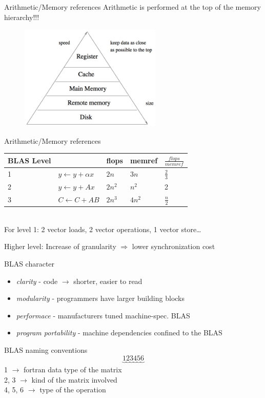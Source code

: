 	\begin{frame}{Arithmetic/Memory references}
		Arithmetic is performed at the top of the memory hierarchy!!!
		\begin{figure}
			\includegraphics[height=5cm]{img/13/arithmeticmemref}
		\end{figure}
	\end{frame}
	\begin{frame}{Arithmetic/Memory references}
		\begin{tabular}{ | l | l | l | l | l |}
		\hline
		BLAS Level & 		& flops 	&memref 	& $\frac{flops}{mem ref}$ \\ \hline
		1 & $y \leftarrow y + \alpha x$ 	& $2n$ 	& $3n$ 	& $\frac{2}{3} $ \\ \hline
		2 & $y \leftarrow y + Ax$ 		& $2n^2$ 	& $n^2$ 	& 2 			\\ \hline
		3 & $C \leftarrow C + AB$ 	& $2n^3$ 	& $4n^2$ 	& $\frac{n}{2}$ 	\\ \hline
		\end{tabular} \\ 
		
		For level 1: 2 vector loads, 2 vector operations, 1 vector store\dots 
		
		Higher level: Increase of granularity $\Rightarrow$ lower synchronization cost
	\end{frame}
	\begin{frame}{BLAS character}
		\begin{itemize}
			\item \textit{clarity} - code $\rightarrow$ shorter, easier to read
			\item \textit{modularity} - programmers have larger building blocks
			\item \textit{performace} - manufacturers tuned machine-spec. BLAS
			\item \textit{program portability} - machine dependencies confined to the BLAS
		\end{itemize}
	\end{frame}
	\begin{frame}{BLAS naming conventions}
	\[
		\underbrace{1}_{} \underbrace{2}_{} \underbrace{3}_{} \underbrace{4}_{} \underbrace{5}_{} \underbrace{6}_{}
	\]
	1 $\rightarrow$ fortran data type of the matrix \\
	2, 3 $\rightarrow$ kind of the matrix involved \\
	4, 5, 6 $\rightarrow$ type of the operation
	\end{frame}
	